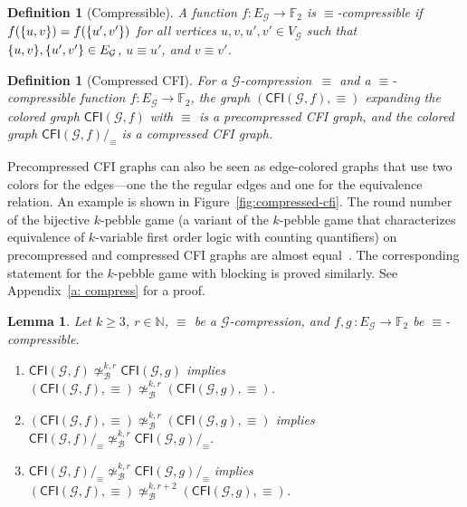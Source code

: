 \documentclass[10pt,a4paper]{article}
\newcommand{\defining}[1]{\emph{#1}}
\DeclarePairedDelimiter\set{\lbrace}{\rbrace}
\newcommand{\comp}{\equiv}
\newcommand{\CFIsym}{\mathsf{CFI}}
\newcommand{\CFI}[1]{\CFIsym(#1)}
\newcommand{\compCFI}[2]{\CFI{#1}/_{#2}}
\newcommand{\precompCFI}[2]{{(\CFI{#1},#2)}}
\newcommand{\nat}{\mathbb{N}}
\newcommand{\FF}{\mathbb{F}}
\newcommand{\graphG}{\mathcal{G}}
\newcommand{\vertexG}{V_{\graphG}}
\newcommand{\edgeG}{E_{\graphG}}
\newcommand{\notkbequivr}[2]{\not\simeq_{\mathcal{B}}^{#1,#2}}
\newtheorem{lemma}[theorem]{Lemma}
\newtheorem{definition}[theorem]{Definition}
\newcommand{\ifAppendix}[1]{#1}
\begin{document}
\begin{definition}[Compressible]
        A function $f\colon \edgeG \to \FF_2$ is \defining{$\comp$-compressible}
        if $f(\set{u,v}) = f(\set{u',v'})$ for all vertices $u,v,u',v' \in \vertexG$
        such that  $\set{u,v},
        \set{u',v'} \in \edgeG$,
        $u \comp u'$, and
        $v \comp v'$.
\end{definition}

\begin{definition}[Compressed CFI]
        For a $\graphG$-compression~$\comp$ and a $\comp$\nobreakdash-compressible function ${f \colon \edgeG \to \FF_2}$,
        the graph $\precompCFI{\graphG,f}{\comp}$ expanding the colored graph $\CFI{\graphG,f}$ with 
       $\comp$ is a \defining{precompressed CFI graph}, and
                the colored graph $\compCFI{\graphG,f}{\comp}$ is a \defining{compressed CFI graph}.
\end{definition}

\noindent Precompressed CFI graphs can also be seen as edge-colored graphs that use two colors for the edges---one the the regular edges and one for the equivalence relation. An example is shown in Figure~\ref{fig:compressed-cfi}.
The round number of the bijective $k$-pebble game (a variant of the $k$-pebble game that characterizes equivalence of $k$-variable first order logic with counting quantifiers) on precompressed and compressed CFI graphs are almost equal~\cite{DBLP:conf/focs/GroheLNS23}.
The corresponding statement for the $k$-pebble game with blocking is proved similarly. \ifAppendix{See Appendix~\ref{a: compress} for a proof.}
\begin{lemma}
        \label{lem:precomp-comp-same-number-of-round}
        Let $k\geq 3$, $r\in\nat$, $\comp$ be a $\graphG$-compression, and
         $f,g \, \colon \edgeG \to \FF_2$ be $\comp$\nobreakdash-compressible.
        \begin{enumerate}
                \item $\CFI{\graphG,f} \notkbequivr{k}{r} \CFI{\graphG,g}$
                implies $\precompCFI{\graphG,f}{\comp} \notkbequivr{k}{r} \precompCFI{\graphG,g}{\comp}$.
                \item \label{claim:precomp_implies_comp} $\precompCFI{\graphG,f}{\comp} \notkbequivr{k}{r} \precompCFI{\graphG,g}{\comp}$
                implies $\compCFI{\graphG,f}{\comp} \notkbequivr{k}{r} \compCFI{\graphG,g}{\comp}$.
                \item $\compCFI{\graphG,f}{\comp} \notkbequivr{k}{r} \compCFI{\graphG,g}{\comp}$ implies
                $\precompCFI{\graphG,f}{\comp} \notkbequivr{k}{r+2} \precompCFI{\graphG,g}{\comp}$.
        \end{enumerate}
\end{lemma}
\end{document}
